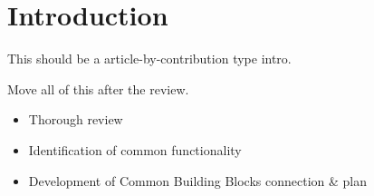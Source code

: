 \section{Introduction}

This should be a article-by-contribution type intro.

Move all of this after the review.

\begin{itemize}
    \item Thorough review
    \item Identification of common functionality
    \item Development of Common Building Blocks connection & plan
\end{itemize}

